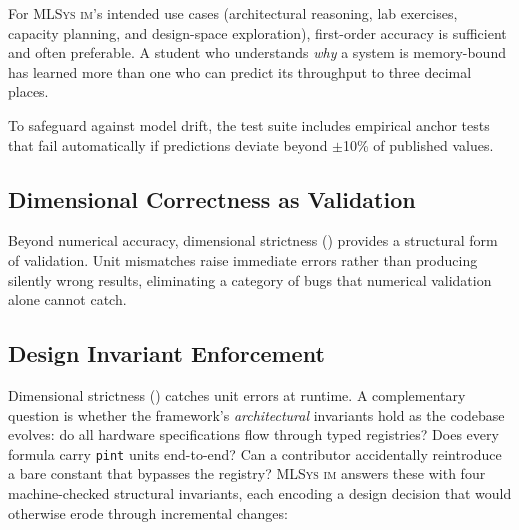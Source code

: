 \documentclass[10pt,twocolumn]{article}
\newcommand{\mlsysim}{\mbox{\textsc{MLSys}\,\textperiodcentered\,\textsc{im}}\xspace}
\begin{document}
For \mlsysim's intended use cases (architectural reasoning, lab exercises, capacity planning, and design-space exploration), first-order accuracy is sufficient and often preferable. A student who understands \emph{why} a system is memory-bound has learned more than one who can predict its throughput to three decimal places.

To safeguard against model drift, the test suite includes empirical anchor tests that fail automatically if predictions deviate beyond $\pm$10\% of published values.

\subsection{Dimensional Correctness as Validation}
\label{sec:validation-dim}

Beyond numerical accuracy, dimensional strictness () provides a structural form of validation. Unit mismatches raise immediate errors rather than producing silently wrong results, eliminating a category of bugs that numerical validation alone cannot catch.

\subsection{Design Invariant Enforcement}
\label{sec:validation-ratchets}

Dimensional strictness () catches unit errors at runtime. A complementary question is whether the framework's \emph{architectural} invariants hold as the codebase evolves: do all hardware specifications flow through typed registries? Does every formula carry \texttt{pint} units end-to-end? Can a contributor accidentally reintroduce a bare constant that bypasses the registry? \mlsysim answers these with four machine-checked structural invariants, each encoding a design decision that would otherwise erode through incremental changes:
\end{document}
